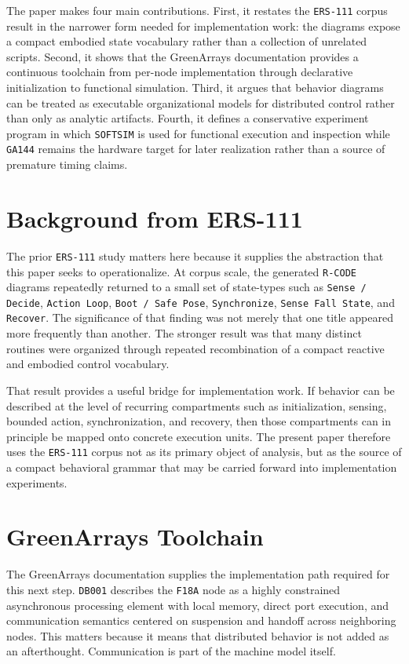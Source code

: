 \documentclass[11pt]{article}
\begin{document}
The paper makes four main contributions. First, it restates the
\texttt{ERS-111} corpus result in the narrower form needed for
implementation work: the diagrams expose a compact embodied state
vocabulary rather than a collection of unrelated scripts. Second, it
shows that the GreenArrays documentation provides a continuous
toolchain from per-node implementation through declarative
initialization to functional simulation. Third, it argues that
behavior diagrams can be treated as executable organizational models
for distributed control rather than only as analytic artifacts.
Fourth, it defines a conservative experiment program in which
\texttt{SOFTSIM} is used for functional execution and inspection while
\texttt{GA144} remains the hardware target for later realization rather
than a source of premature timing claims.

\section*{Background from ERS-111}

The prior \texttt{ERS-111} study matters here because it supplies the
abstraction that this paper seeks to operationalize. At corpus scale,
the generated \texttt{R-CODE} diagrams repeatedly returned to a small
set of state-types such as \texttt{Sense / Decide},
\texttt{Action Loop}, \texttt{Boot / Safe Pose},
\texttt{Synchronize}, \texttt{Sense Fall State}, and
\texttt{Recover}. The significance of that finding was not merely that
one title appeared more frequently than another. The stronger result
was that many distinct routines were organized through repeated
recombination of a compact reactive and embodied control vocabulary.

That result provides a useful bridge for implementation work. If
behavior can be described at the level of recurring compartments such
as initialization, sensing, bounded action, synchronization, and
recovery, then those compartments can in principle be mapped onto
concrete execution units. The present paper therefore uses the
\texttt{ERS-111} corpus not as its primary object of analysis, but as
the source of a compact behavioral grammar that may be carried forward
into implementation experiments.

\section*{GreenArrays Toolchain}

The GreenArrays documentation supplies the implementation path required
for this next step. \texttt{DB001} describes the \texttt{F18A} node as
a highly constrained asynchronous processing element with local memory,
direct port execution, and communication semantics centered on
suspension and handoff across neighboring nodes. This matters because
it means that distributed behavior is not added as an afterthought.
Communication is part of the machine model itself.
\end{document}
